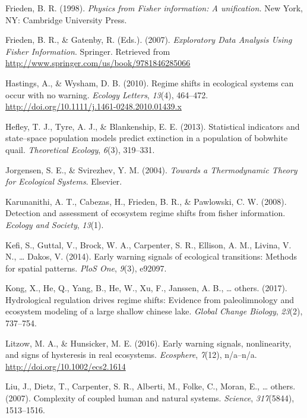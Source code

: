 \documentclass[12pt,twoside,openany]{reedthesis}
\begin{document}
\leavevmode\hypertarget{ref-frieden_physics_1998}{}%
Frieden, B. R. (1998). \emph{Physics from Fisher information: A unification.} New York, NY: Cambridge University Press.

\leavevmode\hypertarget{ref-frieden_exploratory_2007}{}%
Frieden, B. R., \& Gatenby, R. (Eds.). (2007). \emph{Exploratory Data Analysis Using Fisher Information}. Springer. Retrieved from \url{http://www.springer.com/us/book/9781846285066}

\leavevmode\hypertarget{ref-hastings_regime_2010}{}%
Hastings, A., \& Wysham, D. B. (2010). Regime shifts in ecological systems can occur with no warning. \emph{Ecology Letters}, \emph{13}(4), 464--472. \url{http://doi.org/10.1111/j.1461-0248.2010.01439.x}

\leavevmode\hypertarget{ref-hefley2013statistical}{}%
Hefley, T. J., Tyre, A. J., \& Blankenship, E. E. (2013). Statistical indicators and state--space population models predict extinction in a population of bobwhite quail. \emph{Theoretical Ecology}, \emph{6}(3), 319--331.

\leavevmode\hypertarget{ref-jorgensen_towards_2004}{}%
Jorgensen, S. E., \& Svirezhev, Y. M. (2004). \emph{Towards a Thermodynamic Theory for Ecological Systems}. Elsevier.

\leavevmode\hypertarget{ref-karunanithi_detection_2008}{}%
Karunanithi, A. T., Cabezas, H., Frieden, B. R., \& Pawlowski, C. W. (2008). Detection and assessment of ecosystem regime shifts from fisher information. \emph{Ecology and Society}, \emph{13}(1).

\leavevmode\hypertarget{ref-kefi2014early}{}%
Kefi, S., Guttal, V., Brock, W. A., Carpenter, S. R., Ellison, A. M., Livina, V. N., \ldots{} Dakos, V. (2014). Early warning signals of ecological transitions: Methods for spatial patterns. \emph{PloS One}, \emph{9}(3), e92097.

\leavevmode\hypertarget{ref-kong2017hydrological}{}%
Kong, X., He, Q., Yang, B., He, W., Xu, F., Janssen, A. B., \ldots{} others. (2017). Hydrological regulation drives regime shifts: Evidence from paleolimnology and ecosystem modeling of a large shallow chinese lake. \emph{Global Change Biology}, \emph{23}(2), 737--754.

\leavevmode\hypertarget{ref-litzow_early_2016}{}%
Litzow, M. A., \& Hunsicker, M. E. (2016). Early warning signals, nonlinearity, and signs of hysteresis in real ecosystems. \emph{Ecosphere}, \emph{7}(12), n/a--n/a. \url{http://doi.org/10.1002/ecs2.1614}

\leavevmode\hypertarget{ref-liu_complexity_2007}{}%
Liu, J., Dietz, T., Carpenter, S. R., Alberti, M., Folke, C., Moran, E., \ldots{} others. (2007). Complexity of coupled human and natural systems. \emph{Science}, \emph{317}(5844), 1513--1516.
\end{document}

